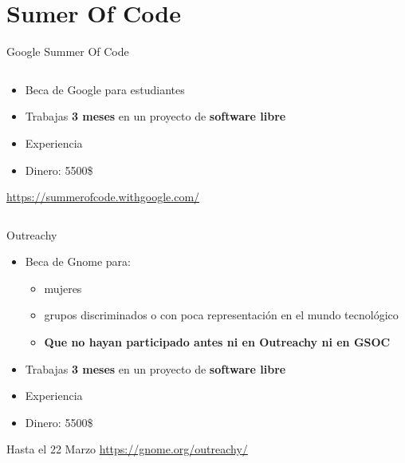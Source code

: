 \documentclass{mybeamer}
\begin{document}
\section{Sumer Of Code}
\begin{framesubsec}[GSOC]{Google Summer Of Code}
	\begin{minipage}[0.2\textheight]{\textwidth}
	\begin{columns}[c]
		\begin{column}{0.7\textwidth}
		\begin{itemize}
			\item Beca de Google para estudiantes
			\item Trabajas \textbf{3 meses} en un proyecto de
				\textbf{software libre}
			\item Experiencia
			\item Dinero: 5500\$
		\end{itemize}
		\vspace{2em}
		\url{https://summerofcode.withgoogle.com/}
		\end{column}

		\begin{column}{0.3\textwidth}
		\end{column}
	\end{columns}
	\end{minipage}
\end{framesubsec}

\begin{framesubsec}{Outreachy}
	\\[2em]
	\begin{itemize}
		\item Beca de Gnome para:
		\begin{itemize}
			\item mujeres
			\item grupos discriminados o con poca
				representación en el mundo tecnológico
			\item \textbf{Que no hayan participado antes ni
				en Outreachy ni en GSOC}
		\end{itemize}
		\item Trabajas \textbf{3 meses} en un proyecto de
			\textbf{software libre}
		\item Experiencia
		\item Dinero: 5500\$
	\end{itemize}
	\vspace{2em}
	Hasta el 22 Marzo
	\url{https://gnome.org/outreachy/}
\end{framesubsec}
\end{document}
